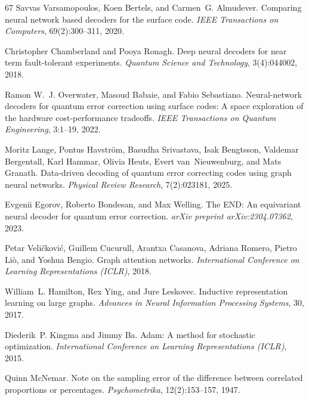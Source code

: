 \documentclass[aps,prxquantum,twocolumn,superscriptaddress,nofootinbib,longbibliography]{revtex4-2}
\begin{document}
\begin{thebibliography}{67}
Savvas Varsamopoulos, Koen Bertels, and Carmen~G. Almudever. Comparing neural
network based decoders for the surface code. \emph{IEEE Transactions on
Computers}, 69(2):300--311, 2020.

Christopher Chamberland and Pooya Ronagh. Deep neural decoders for near term
fault-tolerant experiments. \emph{Quantum Science and Technology},
3(4):044002, 2018.

Ramon W.~J. Overwater, Masoud Babaie, and Fabio Sebastiano. Neural-network
decoders for quantum error correction using surface codes: A space exploration
of the hardware cost-performance tradeoffs. \emph{IEEE Transactions on Quantum
Engineering}, 3:1--19, 2022.

Moritz Lange, Pontus Havstr{\"o}m, Basudha Srivastava, Isak Bengtsson, Valdemar
Bergentall, Karl Hammar, Olivia Heuts, Evert van~Nieuwenburg, and Mats Granath.
Data-driven decoding of quantum error correcting codes using graph neural
networks. \emph{Physical Review Research}, 7(2):023181, 2025.

Evgenii Egorov, Roberto Bondesan, and Max Welling. The {END}: An equivariant
neural decoder for quantum error correction. \emph{arXiv preprint
arXiv:2304.07362}, 2023.

Petar Veli{\v{c}}kovi{\'c}, Guillem Cucurull, Arantxa Casanova, Adriana Romero,
Pietro Li{\`o}, and Yoshua Bengio. Graph attention networks. \emph{International
Conference on Learning Representations (ICLR)}, 2018.

William~L. Hamilton, Rex Ying, and Jure Leskovec. Inductive representation
learning on large graphs. \emph{Advances in Neural Information Processing
Systems}, 30, 2017.

Diederik~P. Kingma and Jimmy Ba. Adam: A method for stochastic optimization.
\emph{International Conference on Learning Representations (ICLR)}, 2015.

Quinn McNemar. Note on the sampling error of the difference between correlated
proportions or percentages. \emph{Psychometrika}, 12(2):153--157, 1947.


\end{thebibliography}
\end{document}

